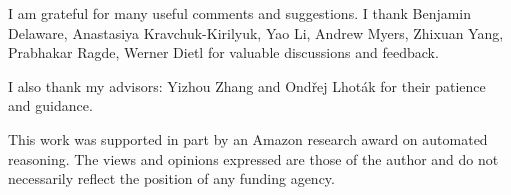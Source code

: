 \vspace*{\fill}

\newpage


\vspace*{\fill}


\vspace*{\fill}


\newpage


\vspace*{\fill}

I am grateful for many useful comments and suggestions.  I thank
Benjamin Delaware,
Anastasiya Kravchuk-Kirilyuk, Yao Li, Andrew Myers, Zhixuan Yang, Prabhakar Ragde, Werner Dietl
for valuable discussions and feedback. 

I also thank my advisors: Yizhou Zhang and Ondřej Lhoták for their patience and guidance.


This work was supported in part by an Amazon research award on automated
reasoning.
The views and opinions expressed are those of the author and do not necessarily
reflect the position of any funding agency.

\vspace*{\fill}

\newpage
\tableofcontents

\newpage 

\vspace*{\fill}


\listoffigures


\vspace*{\fill} 

\newpage 

\vspace*{\fill}



\vspace*{\fill} 






\vspace*{\fill} 